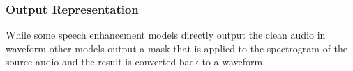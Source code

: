 \subsubsection{Output Representation}
While some speech enhancement models directly output the clean audio in waveform other models output a mask that is applied to the spectrogram of the source audio and the result is converted back to a waveform.
